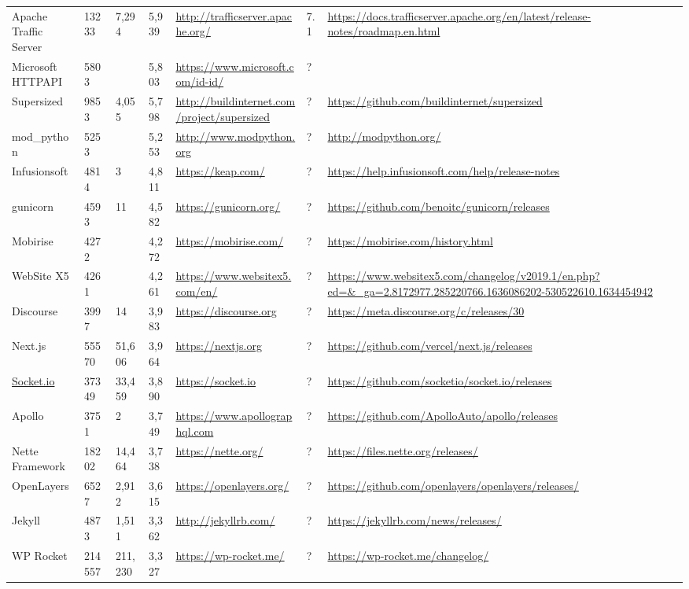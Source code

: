 \begin{table}[!htp]
\begin{tabular}{|l|l|l|l|l|l|l|l|l|}
				Apache Traffic Server &13233 &7,294 &5,939 &\ul{http://trafficserver.apache.org/} &7.1 &\ul{https://docs.trafficserver.apache.org/en/latest/release-notes/roadmap.en.html} & \\
				Microsoft HTTPAPI &5803 & &5,803 &\ul{https://www.microsoft.com/id-id/} &? & & \\
				Supersized &9853 &4,055 &5,798 &\ul{http://buildinternet.com/project/supersized} &? &\ul{https://github.com/buildinternet/supersized} & \\
				mod\_python &5253 & &5,253 &\ul{http://www.modpython.org} &? &\ul{http://modpython.org/} & \\
				Infusionsoft &4814 &3 &4,811 &\ul{https://keap.com/} &? &\ul{https://help.infusionsoft.com/help/release-notes} & \\
				gunicorn &4593 &11 &4,582 &\ul{https://gunicorn.org/} &? &\ul{https://github.com/benoitc/gunicorn/releases} & \\
				Mobirise &4272 & &4,272 &\ul{https://mobirise.com/} &? &\ul{https://mobirise.com/history.html} & \\
				WebSite X5 &4261 & &4,261 &\ul{https://www.websitex5.com/en/} &? &\ul{https://www.websitex5.com/changelog/v2019.1/en.php?ed=\&\_ga=2.8172977.285220766.1636086202-530522610.1634454942} & \\
				Discourse &3997 &14 &3,983 &\ul{https://discourse.org} &? &\ul{https://meta.discourse.org/c/releases/30} & \\
				Next.js &55570 &51,606 &3,964 &\ul{https://nextjs.org} &? &\ul{https://github.com/vercel/next.js/releases} & \\
				\ul{Socket.io} &37349 &33,459 &3,890 &\ul{https://socket.io} &? &\ul{https://github.com/socketio/socket.io/releases} & \\
				Apollo &3751 &2 &3,749 &\ul{https://www.apollographql.com} &? &\ul{https://github.com/ApolloAuto/apollo/releases} & \\
				Nette Framework &18202 &14,464 &3,738 &\ul{https://nette.org/} &? &\ul{https://files.nette.org/releases/} & \\
				OpenLayers &6527 &2,912 &3,615 &\ul{https://openlayers.org/} &? &\ul{https://github.com/openlayers/openlayers/releases/} & \\
				Jekyll &4873 &1,511 &3,362 &\ul{http://jekyllrb.com/} &? &\ul{https://jekyllrb.com/news/releases/} & \\
				WP Rocket &214557 &211,230 &3,327 &\ul{https://wp-rocket.me/} &? &\ul{https://wp-rocket.me/changelog/} & \\

\end{tabular}
\end{table}
